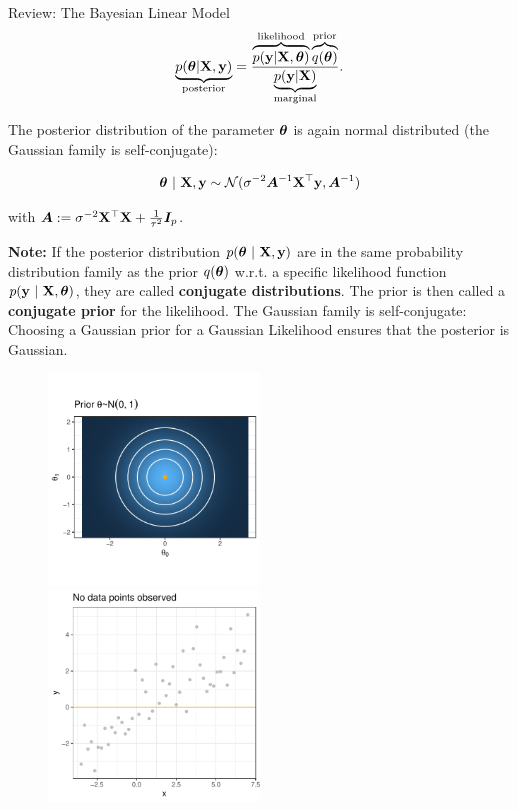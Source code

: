 \documentclass[11pt,compress,t,notes=noshow, xcolor=table]{beamer}
\begin{document}
\begin{vbframe}{Review: The Bayesian Linear Model}
$$
\underbrace{p(\bm{\theta} | \mathbf{X}, \mathbf{y})}_{\text{posterior}} = \frac{\overbrace{p(\mathbf{y} | \mathbf{X}, \bm{\theta})}^{\text{likelihood}}\overbrace{q(\bm{\theta})}^{\text{prior}}}{\underbrace{p(\mathbf{y}|\mathbf{X})}_{\text{marginal}}}. 
$$

\framebreak 

The posterior distribution of the parameter $\bm{\theta}$ is again normal distributed (the Gaussian family is self-conjugate): 

$$
\bm{\theta} ~|~ \mathbf{X}, \mathbf{y} \sim \mathcal{N}(\sigma^{-2}\bm{A}^{-1}\mathbf{X}^\top\mathbf{y}, \bm{A}^{-1})
$$

with $\bm{A}:= \sigma^{-2}\mathbf{X}^\top\mathbf{X} + \frac{1}{\tau^2} \bm{I}_p$.

\lz 

\begin{footnotesize}
\textbf{Note:} If the posterior distribution $p(\bm{\theta}~|~\mathbf{X}, \mathbf{y})$ are in the same probability distribution family as the prior $q(\bm{\theta})$ w.r.t. a specific likelihood function $p(\mathbf{y}~|~\mathbf{X}, \bm{\theta})$, they are called \textbf{conjugate distributions}. The prior is then called a \textbf{conjugate prior} for the likelihood. The Gaussian family is self-conjugate: Choosing a Gaussian prior for a Gaussian Likelihood ensures that the posterior is Gaussian. 
\end{footnotesize}

\framebreak 

\begin{figure}
  \includegraphics[width=0.5\textwidth]{figure/bayes_lm/prior_1.pdf}~\includegraphics[width=0.5\textwidth]{figure/bayes_lm/prior_2.pdf}
\end{figure}


\end{vbframe}
\end{document}
